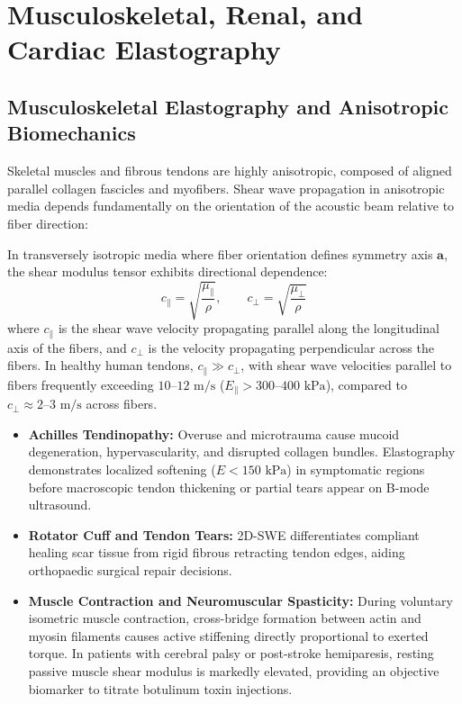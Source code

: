 \documentclass[11pt,a4paper]{article}
\begin{document}
\section{Musculoskeletal, Renal, and Cardiac Elastography}

\subsection{Musculoskeletal Elastography and Anisotropic Biomechanics}
Skeletal muscles and fibrous tendons are highly anisotropic, composed of aligned parallel collagen fascicles and myofibers. Shear wave propagation in anisotropic media depends fundamentally on the orientation of the acoustic beam relative to fiber direction:
\begin{physicsbox}
In transversely isotropic media where fiber orientation defines symmetry axis $\mathbf{a}$, the shear modulus tensor exhibits directional dependence:
\begin{equation}
    c_{\parallel} = \sqrt{\frac{\mu_{\parallel}}{\rho}}, \qquad c_{\perp} = \sqrt{\frac{\mu_{\perp}}{\rho}}
\end{equation}
where $c_{\parallel}$ is the shear wave velocity propagating parallel along the longitudinal axis of the fibers, and $c_{\perp}$ is the velocity propagating perpendicular across the fibers. In healthy human tendons, $c_{\parallel} \gg c_{\perp}$, with shear wave velocities parallel to fibers frequently exceeding $10\text{--}12\text{ m/s}$ ($E_{\parallel} > 300\text{--}400\text{ kPa}$), compared to $c_{\perp} \approx 2\text{--}3\text{ m/s}$ across fibers.
\end{physicsbox}

\begin{itemize}[leftmargin=2em]
    \item \textbf{Achilles Tendinopathy:} Overuse and microtrauma cause mucoid degeneration, hypervascularity, and disrupted collagen bundles. Elastography demonstrates localized softening ($E < 150\text{ kPa}$) in symptomatic regions before macroscopic tendon thickening or partial tears appear on B-mode ultrasound.
    \item \textbf{Rotator Cuff and Tendon Tears:} 2D-SWE differentiates compliant healing scar tissue from rigid fibrous retracting tendon edges, aiding orthopaedic surgical repair decisions.
    \item \textbf{Muscle Contraction and Neuromuscular Spasticity:} During voluntary isometric muscle contraction, cross-bridge formation between actin and myosin filaments causes active stiffening directly proportional to exerted torque. In patients with cerebral palsy or post-stroke hemiparesis, resting passive muscle shear modulus is markedly elevated, providing an objective biomarker to titrate botulinum toxin injections.
\end{itemize}
\end{document}
